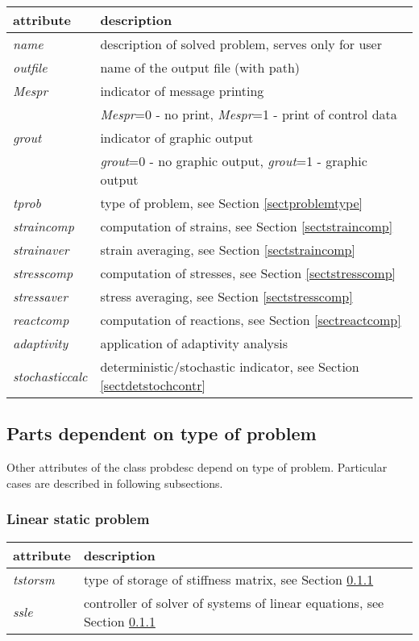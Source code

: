 \begin{center}
\begin{tabular}{|l|l|}
\hline
attribute & description
\\ \hline
{\it name} & description of solved problem, serves only for user
\\
{\it outfile} & name of the output file (with path)
\\
{\it Mespr} & indicator of message printing
\\
 & {\it Mespr}=0 - no print, {\it Mespr}=1 - print of control data
\\
{\it grout} & indicator of graphic output
\\
 & {\it grout}=0 - no graphic output, {\it grout}=1 - graphic output
\\
{\it tprob} & type of problem, see Section \ref{sectproblemtype}
\\
{\it straincomp} & computation of strains, see Section \ref{sectstraincomp}
\\
{\it strainaver} & strain averaging, see Section \ref{sectstraincomp}
\\
{\it stresscomp} & computation of stresses, see Section \ref{sectstresscomp}
\\
{\it stressaver} & stress averaging, see Section \ref{sectstresscomp}
\\
{\it reactcomp} & computation of reactions, see Section \ref{sectreactcomp}
\\
{\it adaptivity} & application of adaptivity analysis
\\
{\it stochasticcalc} & deterministic/stochastic indicator, see Section \ref{sectdetstochcontr}
\\ \hline
\end{tabular}
\end{center}

\subsection{Parts dependent on type of problem}

Other attributes of the class {\sf probdesc} depend on type of problem. Particular cases
are described in following subsections.

\subsubsection{Linear static problem}

\begin{center}
\begin{tabular}{|l|l|}
\hline
attribute & description
\\ \hline
{\it tstorsm} & type of storage of stiffness matrix, see Section \ref{}
\\
{\it ssle} & controller of solver of systems of linear equations, see Section \ref{}
\\ \hline
\end{tabular}
\end{center}


